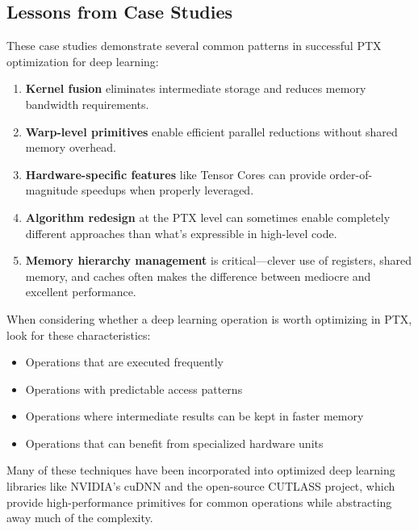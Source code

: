 \subsection{Lessons from Case Studies}

These case studies demonstrate several common patterns in successful PTX optimization for deep learning:

\begin{enumerate}
    \item \textbf{Kernel fusion} eliminates intermediate storage and reduces memory bandwidth requirements.
    
    \item \textbf{Warp-level primitives} enable efficient parallel reductions without shared memory overhead.
    
    \item \textbf{Hardware-specific features} like Tensor Cores can provide order-of-magnitude speedups when properly leveraged.
    
    \item \textbf{Algorithm redesign} at the PTX level can sometimes enable completely different approaches than what's expressible in high-level code.
    
    \item \textbf{Memory hierarchy management} is critical—clever use of registers, shared memory, and caches often makes the difference between mediocre and excellent performance.
\end{enumerate}

When considering whether a deep learning operation is worth optimizing in PTX, look for these characteristics:
\begin{itemize}
    \item Operations that are executed frequently
    \item Operations with predictable access patterns
    \item Operations where intermediate results can be kept in faster memory
    \item Operations that can benefit from specialized hardware units
\end{itemize}

Many of these techniques have been incorporated into optimized deep learning libraries like NVIDIA's cuDNN and the open-source CUTLASS project, which provide high-performance primitives for common operations while abstracting away much of the complexity.

